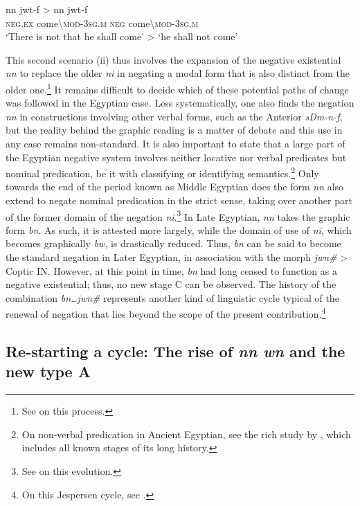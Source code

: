 \documentclass[output=paper]{langsci/langscibook}
\newcommand{\ꜥ}{ʿ}
\newcommand{\ꜣ}{\kern-.25pt\texttt{ꜣ}\kern-.6pt}
\begin{document}
\ea \label{ex:AE36}
    \gll nn jwt-f > nn jwt-f \\
    \textsc{neg.ex} come\textbackslash\textsc{mod-3sg.m} { } \textsc{neg} come\textbackslash\textsc{mod-3sg.m} \\ 
    \glt ‘There is not that he shall come’ > ‘he shall not come’ 
\z
 
This second scenario (ii) thus involves the expansion of the negative existential \textit{nn} to replace the older \textit{ni} in negating a modal form that is also distinct from the older one.\footnote{See \citet{Vernus1990} on this process. } It remains difficult to decide which of these potential paths of change was followed in the Egyptian case.  
Less systematically, one also finds the negation \textit{nn} in constructions involving other verbal forms, such as the Anterior \textit{sDm-n-f}, but the reality behind the graphic reading is a matter of debate and this use in any case remains non-standard. It is also important to state that a large part of the Egyptian negative system involves neither locative nor verbal predicates but nominal predication, be it with classifying or identifying semantics.\footnote{On non-verbal predication in Ancient Egyptian, see the rich study by \citet{Loprieno-etal2017}, which includes all known stages of its long history. } 
Only towards the end of the period known as Middle Egyptian does the form \textit{nn} also extend to negate nominal predication in the strict sense, taking over another part of the former domain of the negation \textit{ni}.\footnote{See \citet{Uljas2013} on this evolution.} 
In Late Egyptian, \textit{nn} takes the graphic form \textit{bn}. As such, it is attested more largely, while the domain of use of \textit{ni}, which becomes graphically \textit{bw}, is drastically reduced. Thus, \textit{bn} can be said to become the standard negation in Later Egyptian, in association with the morph \textit{jwn\#} > Coptic IN. However, at this point in time, \textit{bn} had long ceased to function as a negative existential; thus, no new stage C can be observed. The history of the combination \textit{bn…jwn\#} represents another kind of linguistic cycle typical of the renewal of negation that lies beyond the scope of the present contribution.\footnote{On this Jespersen cycle, see \citet{Winand1997}.}   

\subsection{Re-starting a cycle: The rise of \textit{nn wn} and the new type A}\label{s:AE2-5}
\end{document}
